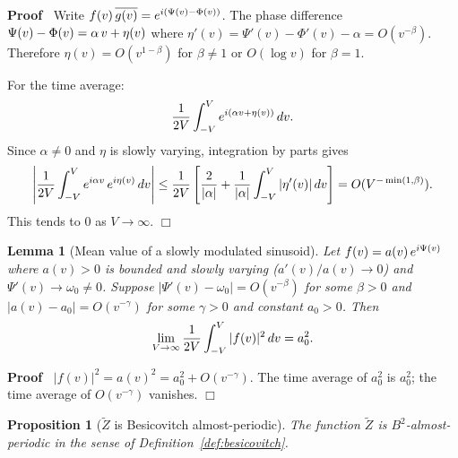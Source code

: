 \documentclass{article}
\newenvironment{proof}{\noindent\textbf{Proof\ }}{\hspace*{\fill}$\Box$\medskip}
\newtheorem{lemma}{Lemma}
\newtheorem{proposition}{Proposition}
{\theorembodyfont{\rmfamily}\newtheorem{remark}{Remark}}
\begin{document}
\begin{proof}
  Write $f (v) \hspace{0.17em} \overline{g (v)} = e^{i (\Psi (v) - \Phi
  (v))}$. The phase difference $\Psi (v) - \Phi (v) = \alpha \hspace{0.17em} v
  + \eta (v)$ where $\eta' (v) = \Psi' (v) - \Phi' (v) - \alpha = O (v^{-
  \beta})$. Therefore $\eta (v) = O (v^{1 - \beta})$ for $\beta \ne 1$ or $O
  (\log v)$ for $\beta = 1$.
  
  For the time average:
  \[ \frac{1}{2 V}  \int_{- V}^V e^{i (\alpha v + \eta (v))}  \hspace{0.17em}
     dv. \]
  Since $\alpha \ne 0$ and $\eta$ is slowly varying, integration by parts
  gives
  \[ \left| \frac{1}{2 V}  \int_{- V}^V e^{i \alpha v}  \hspace{0.17em} e^{i
     \eta (v)}  \hspace{0.17em} dv \right| \le \frac{1}{2 V}  \left[
     \frac{2}{| \alpha |} + \frac{1}{| \alpha |}  \int_{- V}^V | \eta' (v) |
     \hspace{0.17em} dv \right] = O (V^{- \min (1, \beta)}) . \]
  This tends to $0$ as $V \to \infty$.
\end{proof}

\begin{lemma}
  [Mean value of a slowly modulated sinusoid]\label{lem:mean-val} Let $f (v) =
  a (v)  \hspace{0.17em} e^{i \Psi (v)}$ where $a (v) > 0$ is bounded and
  slowly varying ($a' (v) / a (v) \to 0$) and $\Psi' (v) \to \omega_0 \ne 0$.
  Suppose $| \Psi' (v) - \omega_0 | = O (v^{- \beta})$ for some $\beta > 0$
  and $|a (v) - a_0 | = O (v^{- \gamma})$ for some $\gamma > 0$ and constant
  $a_0 > 0$. Then
  \begin{equation}
    \label{eq:mean-val} \lim_{V \to \infty}  \frac{1}{2 V}  \int_{- V}^V |f
    (v) |^2  \hspace{0.17em} dv = a_0^2 .
  \end{equation}
\end{lemma}

\begin{proof}
  $|f (v) |^2 = a (v)^2 = a_0^2 + O (v^{- \gamma})$. The time average of
  $a_0^2$ is $a_0^2$; the time average of $O (v^{- \gamma})$ vanishes.
\end{proof}

\begin{proposition}
  [$\tilde{Z}$ is Besicovitch almost-periodic]\label{prop:B2} The function
  $\tilde{Z}$ is $B^2$-almost-periodic in the sense of
  Definition~\ref{def:besicovitch}.
\end{proposition}
\end{document}
